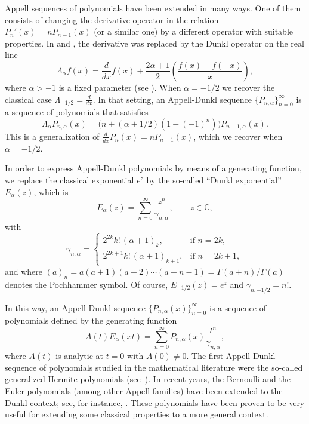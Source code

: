 \documentclass[11pt,a4paper]{amsart}
\newcommand{\C}{\mathbb{C}}
\newcommand{\Ea}{E_{\alpha}}
\newcommand{\La}{\Lambda_{\alpha}}
\theoremstyle{plain}
\theoremstyle{plain}
\theoremstyle{remark}
\numberwithin{equation}{section}
\begin{document}
Appell sequences of polynomials have been extended in many ways. 
One of them consists of changing the derivative operator in the relation $P_n'(x) = n P_{n-1}(x)$ (or a similar one) by a different operator with suitable properties. 
In \cite{CDPV} and \cite{DH}, the derivative was replaced by the Dunkl operator on the real line
\begin{equation*}
  \La f(x) = \frac{d}{dx}f(x) + \frac{2\alpha+1}{2}
  \left(\frac{f(x)-f(-x)}{x}\right),
\end{equation*}
where $\alpha > -1$ is a fixed parameter (see \cite{Du, Ros}). When $\alpha=-1/2$ we recover the classical case $\Lambda_{-1/2} = \frac{d}{dx}$. In that setting, an Appell-Dunkl sequence $\{P_{n,\alpha}\}_{n=0}^{\infty}$ is a sequence of polynomials that satisfies
\begin{equation*}
  \La P_{n,\alpha}(x) = \big(n+(\alpha+1/2)(1-(-1)^n)\big) P_{n-1,\alpha}(x).
\end{equation*}
This is a generalization of $\frac{d}{dx} P_{n}(x) = n P_{n-1}(x)$, which we recover when $\alpha=-1/2$.

In order to express Appell-Dunkl polynomials by means of a generating function, we replace the classical exponential $e^z$ by the so-called ``Dunkl exponential'' $\Ea(z)$, which is 
\[
  \Ea(z) = \sum_{n=0}^\infty \frac{z^n}{\gamma_{n,\alpha}}, \qquad z \in \C,
\]
with 
\begin{equation*}
\gamma_{n,\alpha} =
\begin{cases} 
  2^{2k}k!\,(\alpha+1)_k, & \text{if $n=2k$},\\
  2^{2k+1}k!\,(\alpha+1)_{k+1}, & \text{if $n=2k+1$},
\end{cases}
\end{equation*}
and where $(a)_n = a(a+1)(a+2) \cdots (a+n-1) = \Gamma(a+n)/\Gamma(a)$ denotes the Pochhammer symbol. 
Of course, $E_{-1/2}(z) = e^z$ and $\gamma_{n,-1/2} = n!$.

In this way, an Appell-Dunkl sequence $\{P_{n,\alpha}(x)\}_{n=0}^{\infty}$ is a sequence of polynomials defined by the generating function
\begin{equation*}
  A(t)\Ea(xt) = \sum_{n=0}^\infty P_{n,\alpha}(x) \frac{t^n}{\gamma_{n,\alpha}},
\end{equation*} 
where $A(t)$ is analytic at $t=0$ with $A(0)\ne0$.
The first Appell-Dunkl sequence of polynomials studied in the mathematical literature were the so-called generalized Hermite polynomials (see~\cite{Ros}). In recent years,  the Bernoulli and the Euler polynomials (among other Appell families) have been extended to the Dunkl context; see, for instance, \cite{CDPV, CMV, DPV}. These polynomials have been proven to be very useful for extending some classical properties to a more general context.
\end{document}

